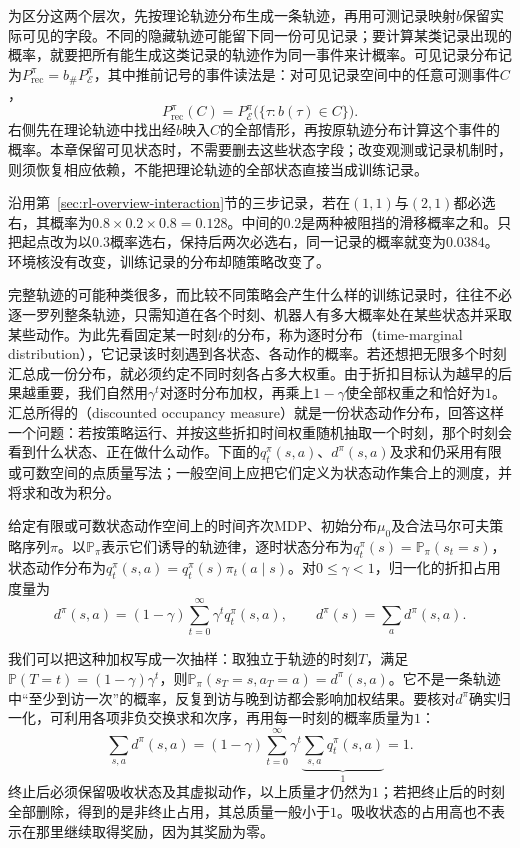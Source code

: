 为区分这两个层次，先按理论轨迹分布生成一条轨迹，再用可测记录映射$b$保留实际可见的字段。不同的隐藏轨迹可能留下同一份可见记录；要计算某类记录出现的概率，就要把所有能生成这类记录的轨迹作为同一事件来计概率。可见记录分布记为$P_{\mathrm{rec}}^{\pi}=b_{\#}P_{\mathcal E}^{\pi}$，其中推前记号的事件读法是：对可见记录空间中的任意可测事件$C$，
\[
 P_{\mathrm{rec}}^{\pi}(C)
 =P_{\mathcal E}^{\pi}\bigl(\{\tau:b(\tau)\in C\}\bigr).
\]
右侧先在理论轨迹中找出经$b$映入$C$的全部情形，再按原轨迹分布计算这个事件的概率。本章保留可见状态时，不需要删去这些状态字段；改变观测或记录机制时，则须恢复相应依赖，不能把理论轨迹的全部状态直接当成训练记录。

沿用第~\ref{sec:rl-overview-interaction}节的三步记录，若在$(1,1)$与$(2,1)$都必选右，其概率为$0.8\times0.2\times0.8=0.128$。中间的$0.2$是两种被阻挡的滑移概率之和。只把起点改为以$0.3$概率选右，保持后两次必选右，同一记录的概率就变为$0.0384$。环境核没有改变，训练记录的分布却随策略改变了。

完整轨迹的可能种类很多，而比较不同策略会产生什么样的训练记录时，往往不必逐一罗列整条轨迹，只需知道在各个时刻、机器人有多大概率处在某些状态并采取某些动作。为此先看固定某一时刻$t$的分布，称为逐时分布（time-marginal distribution），它记录该时刻遇到各状态、各动作的概率。若还想把无限多个时刻汇总成一份分布，就必须约定不同时刻各占多大权重。由于折扣目标认为越早的后果越重要，我们自然用$\gamma^t$对逐时分布加权，再乘上$1-\gamma$使全部权重之和恰好为$1$。汇总所得的（discounted occupancy measure）就是一份状态动作分布，回答这样一个问题：若按策略运行、并按这些折扣时间权重随机抽取一个时刻，那个时刻会看到什么状态、正在做什么动作。下面的$q_t^\pi(s,a)$、$d^\pi(s,a)$及求和仍采用有限或可数空间的点质量写法；一般空间上应把它们定义为状态动作集合上的测度，并将求和改为积分。

\begin{definition}[逐时分布与折扣占用度量]
  \label{def:rl-overview-occupancy}
  给定有限或可数状态动作空间上的时间齐次MDP、初始分布$\mu_0$及合法马尔可夫策略序列$\pi$。以$\mathbb P_\pi$表示它们诱导的轨迹律，逐时状态分布为$q_t^\pi(s)=\mathbb P_\pi(s_t=s)$，状态动作分布为$q_t^\pi(s,a)=q_t^\pi(s)\pi_t(a\mid s)$。对$0\leq\gamma<1$，归一化的折扣占用度量为
  \begin{equation}
    d^\pi(s,a)=(1-\gamma)\sum_{t=0}^{\infty}
      \gamma^t q_t^\pi(s,a),\qquad
    d^\pi(s)=\sum_a d^\pi(s,a).
    \label{eq:rl-overview-occupancy}
  \end{equation}
\end{definition}

我们可以把这种加权写成一次抽样：取独立于轨迹的时刻$T$，满足$\mathbb P(T=t)=(1-\gamma)\gamma^t$，则$\mathbb P_\pi(s_T=s,a_T=a)=d^\pi(s,a)$。它不是一条轨迹中“至少到访一次”的概率，反复到访与晚到访都会影响加权结果。要核对$d^\pi$确实归一化，可利用各项非负交换求和次序，再用每一时刻的概率质量为$1$：
\[
  \sum_{s,a}d^\pi(s,a)
  =(1-\gamma)\sum_{t=0}^{\infty}\gamma^t
    \underbrace{\sum_{s,a}q_t^\pi(s,a)}_{1}=1.
\]
终止后必须保留吸收状态及其虚拟动作，以上质量才仍然为$1$；若把终止后的时刻全部删除，得到的是非终止占用，其总质量一般小于$1$。吸收状态的占用高也不表示在那里继续取得奖励，因为其奖励为零。

